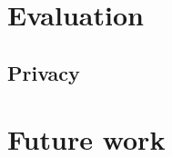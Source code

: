 \documentclass{report}
\begin{document}
\chapter{Evaluation}
\section{Privacy}










\chapter{Future work}





\printbibliography
\end{document}
